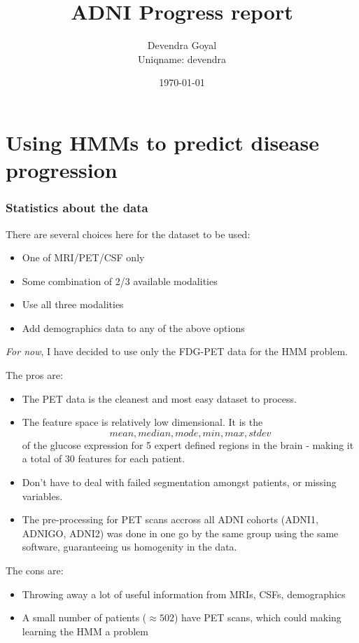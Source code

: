 \documentclass[12pt,a4paper]{article}
\title{ADNI Progress report}
\author{Devendra Goyal\\Uniqname: devendra}
\date{\today}
\begin{document}
\maketitle

\part{Using HMMs to predict disease progression}

\section{Statistics about the data}
\label{sec:data}

There are several choices here for the dataset to be used:

\begin{itemize}
\item One of MRI/PET/CSF only
\item Some combination of 2/3 available modalities
\item Use all three modalities
\item Add demographics data to any of the above options
\end{itemize}

\emph{For now}, I have decided to use only the FDG-PET data for the
HMM problem. 

The pros are:

\begin{itemize}
\item The PET data is the cleanest and most easy dataset to process.
\item The feature space is relatively low dimensional. It is
  the \[mean, median, mode, min, max, stdev\] of the glucose
  expression for 5 expert defined regions in the brain - making it a
  total of 30 features for each patient.
\item Don't have to deal with failed segmentation amongst patients, or
  missing variables.
\item The pre-processing for PET scans accross all ADNI cohorts
  (ADNI1, ADNIGO, ADNI2) was done in one go by the same group using
  the same software, guaranteeing us homogenity in the data.
\end{itemize}

The cons are:

\begin{itemize}
\item Throwing away a lot of useful information from MRIs, CSFs, demographics
\item A small number of patients ($\approx 502$) have PET scans, which
  could making learning the HMM a problem
\end{itemize}
\end{document}
